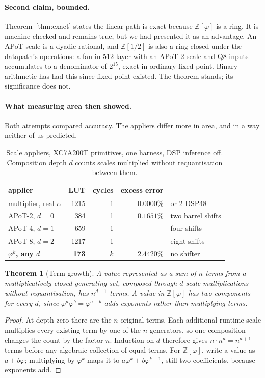 \documentclass[11pt]{article}
\newtheorem{theorem}{Theorem}
\theoremstyle{definition}
\begin{document}
\paragraph{Second claim, bounded.} Theorem~\ref{thm:exact} states the linear path
is exact because $\mathbb{Z}[\varphi]$ is a ring. It is machine-checked and
remains true, but we had presented it as an advantage. An APoT scale is a dyadic
rational, and $\mathbb{Z}[1/2]$ is also a ring closed under the datapath's
operations: a fan-in-512 layer with an APoT-2 scale and Q8 inputs accumulates to a
denominator of $2^{15}$, exact in ordinary fixed point. Binary arithmetic has had
this since fixed point existed. The theorem stands; its significance does not.

\paragraph{What measuring area then showed.} Both attempts compared accuracy. The
appliers differ more in area, and in a way neither of us predicted.

\begin{table}[t]\centering
\caption{Scale appliers, XC7A200T primitives, one harness, DSP inference off.
Composition depth $d$ counts scales multiplied without requantisation between
them.}
\label{tab:scalefrontier}
\begin{tabular}{lrrrl}
\toprule
applier & LUT & cycles & excess error & \\
\midrule
multiplier, real $\alpha$ & 1215 & 1 & $0.0000\%$ & or 2 DSP48 \\
APoT-2, $d=0$ & 384 & 1 & $0.1651\%$ & two barrel shifts \\
APoT-4, $d=1$ & 659 & 1 & --- & four shifts \\
APoT-8, $d=2$ & 1217 & 1 & --- & eight shifts \\
\textbf{$\varphi^{k}$, any $d$} & \textbf{173} & $k$ & $2.4420\%$ & no shifter \\
\bottomrule
\end{tabular}
\end{table}

\begin{theorem}[Term growth]
\label{thm:termgrowth}
A value represented as a sum of $n$ terms from a multiplicatively closed
generating set, composed through $d$ scale multiplications without
requantisation, has $n^{d+1}$ terms. A value in $\mathbb{Z}[\varphi]$ has two
components for every $d$, since $\varphi^{a}\varphi^{b} = \varphi^{a+b}$ adds
exponents rather than multiplying terms.
\end{theorem}
\begin{proof}
At depth zero there are the $n$ original terms.  Each additional runtime scale
multiplies every existing term by one of the $n$ generators, so one composition
changes the count by the factor $n$.  Induction on $d$ therefore gives
$n\cdot n^{d}=n^{d+1}$ terms before any algebraic collection of equal terms.
For $\mathbb{Z}[\varphi]$, write a value as $a+b\varphi$; multiplying by
$\varphi^{k}$ maps it to
$a\varphi^{k}+b\varphi^{k+1}$, still two coefficients, because exponents add.
\end{proof}
\end{document}
